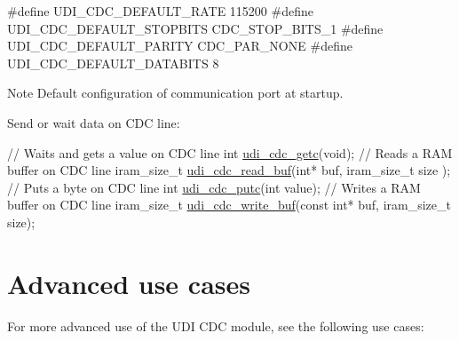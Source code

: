 \begin{DoxyEnumerate}
\begin{DoxyItemize}
\item 
\begin{DoxyCode}
\textcolor{preprocessor}{ #define  UDI\_CDC\_DEFAULT\_RATE             115200}
\textcolor{preprocessor}{}\textcolor{preprocessor}{        #define  UDI\_CDC\_DEFAULT\_STOPBITS         CDC\_STOP\_BITS\_1}
\textcolor{preprocessor}{}\textcolor{preprocessor}{        #define  UDI\_CDC\_DEFAULT\_PARITY           CDC\_PAR\_NONE}
\textcolor{preprocessor}{        #define  UDI\_CDC\_DEFAULT\_DATABITS         8 }
\end{DoxyCode}
 \begin{DoxyNote}{Note}
Default configuration of communication port at startup.
\end{DoxyNote}

\end{DoxyItemize}
\item Send or wait data on C\-D\-C line\-:
\begin{DoxyItemize}
\item 
\begin{DoxyCode}
 \textcolor{comment}{// Waits and gets a value on CDC line}
        \textcolor{keywordtype}{int} \hyperlink{group__udi__cdc__group_ga202f3fd7b153f6e1a41601735e0febb6}{udi\_cdc\_getc}(\textcolor{keywordtype}{void});
        \textcolor{comment}{// Reads a RAM buffer on CDC line}
        iram\_size\_t \hyperlink{group__udi__cdc__group_gaf100ac6cd39574749c54d203b5d7835b}{udi\_cdc\_read\_buf}(\textcolor{keywordtype}{int}* buf, iram\_size\_t size
      );
        \textcolor{comment}{// Puts a byte on CDC line}
        \textcolor{keywordtype}{int} \hyperlink{group__udi__cdc__group_ga8faae3fcf4911017c0fcf0aa127179f6}{udi\_cdc\_putc}(\textcolor{keywordtype}{int} value);
        \textcolor{comment}{// Writes a RAM buffer on CDC line}
        iram\_size\_t \hyperlink{group__udi__cdc__group_ga705496169ff423f3e3d3b5ff882d3f9b}{udi\_cdc\_write\_buf}(\textcolor{keyword}{const} \textcolor{keywordtype}{int}* buf, 
      iram\_size\_t size); 
\end{DoxyCode}

\end{DoxyItemize}
\end{DoxyEnumerate}\hypertarget{udi_cdc_quickstart_udi_cdc_use_cases}{}\section{Advanced use cases}\label{udi_cdc_quickstart_udi_cdc_use_cases}
For more advanced use of the U\-D\-I C\-D\-C module, see the following use cases\-:
